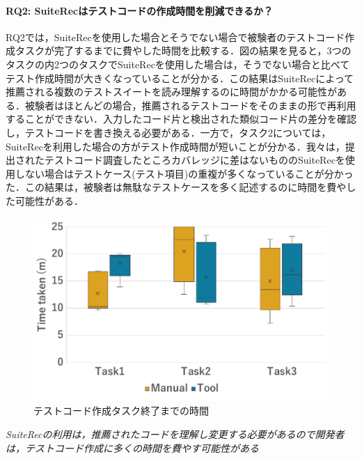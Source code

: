 \documentclass[12pt]{jarticle} %
\begin{document}
\paragraph{RQ2: {\sf SuiteRec}はテストコードの作成時間を削減できるか？}RQ2では，{\sf SuiteRec}を使用した場合とそうでない場合で被験者のテストコード作成タスクが完了するまでに費やした時間を比較する．図の結果を見ると，3つのタスクの内2つのタスクで{\sf SuiteRec}を使用した場合は，そうでない場合と比べてテスト作成時間が大きくなっていることが分かる．この結果は{\sf SuiteRec}によって推薦される複数のテストスイートを読み理解するのに時間がかかる可能性がある．被験者はほとんどの場合，推薦されるテストコードをそのままの形で再利用することができない．入力したコード片と検出された類似コード片の差分を確認し，テストコードを書き換える必要がある．一方で，タスク2については，{\sf SuiteRec}を利用した場合の方がテスト作成時間が短いことが分かる．我々は，提出されたテストコード調査したところカバレッジに差はないものの{\sf SuiteRec}を使用しない場合はテストケース(テスト項目)の重複が多くなっていることが分かった．この結果は，被験者は無駄なテストケースを多く記述するのに時間を費やした可能性がある．


\begin{figure}[htbp]
  \begin{center}
   \includegraphics[width=12cm]{time.pdf}
  \caption{テストコード作成タスク終了までの時間}
  \label{time}
  \end{center}
\end{figure}

\begin{breakbox}
\textit{{\sf SuiteRec}の利用は，推薦されたコードを理解し変更する必要があるので開発者は，テストコード作成に多くの時間を費やす可能性がある}
\end{breakbox}
\end{document}
